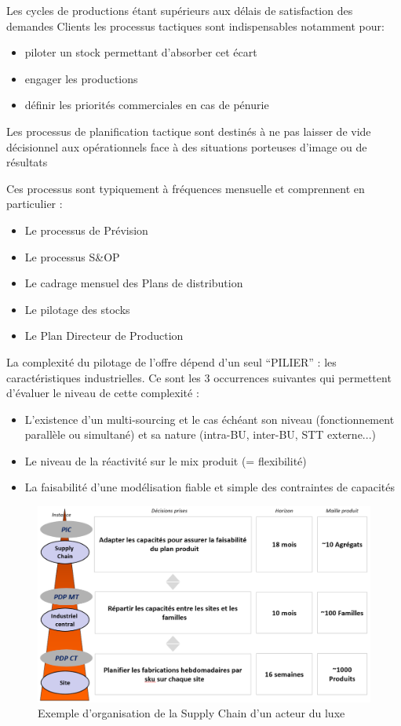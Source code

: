 Les cycles de productions étant supérieurs aux délais de satisfaction des demandes Clients les processus tactiques sont indispensables notamment pour:
\begin{itemize}
  \item piloter un stock permettant d'absorber cet écart
  \item engager les productions 
  \item définir les priorités commerciales en cas de pénurie
\end{itemize}

Les processus de planification tactique sont destinés à ne pas laisser de vide décisionnel aux opérationnels face à des situations porteuses d'image ou de résultats 

Ces processus sont typiquement à fréquences mensuelle et comprennent en particulier :
\begin{itemize}
  \item Le processus de Prévision
  \item Le processus S\&OP
  \item Le cadrage mensuel des Plans de distribution
  \item Le pilotage des stocks
  \item Le Plan Directeur de Production
\end{itemize}

La complexité du pilotage de l’offre dépend d’un seul ``PILIER'' : les caractéristiques industrielles. Ce sont les 3 occurrences suivantes qui permettent d’évaluer le niveau de cette complexité :
\begin{itemize}
  \item L’existence d’un multi-sourcing et le cas échéant son niveau (fonctionnement parallèle ou simultané) et sa nature (intra-BU, inter-BU, STT externe...)
  \item Le niveau de la réactivité sur le mix produit (= flexibilité)
  \item La faisabilité d’une modélisation fiable et simple des contraintes de capacités
\end{itemize}


\begin{figure}[h]
  \centering
  \includegraphics[width=\textwidth]{main/introduction/images/exemple_SC_luxe.png}
  \caption{Exemple d'organisation de la Supply Chain d'un acteur du luxe}
  \label{fig:exemple-SC-luxe}
\end{figure}


